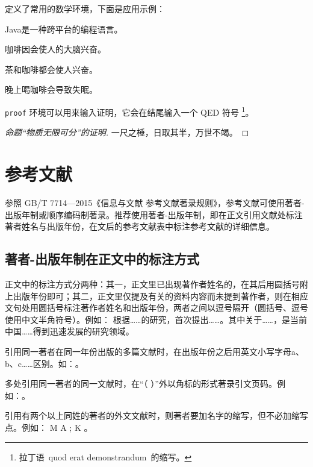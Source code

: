 \ucasthesis{} 定义了常用的数学环境，下面是应用示例：
\begin{definition}
Java是一种跨平台的编程语言。
\end{definition}

\begin{theorem}
咖啡因会使人的大脑兴奋。
\end{theorem}

\begin{lemma}
茶和咖啡都会使人兴奋。
\end{lemma}

\begin{corollary}
晚上喝咖啡会导致失眠。
\end{corollary}

\texttt{proof} 环境可以用来输入证明，它会在结尾输入一个 QED 符号
\footnote{拉丁语~quod erat demonstrandum~的缩写。}。

\begin{proof}[命题“物质无限可分”的证明]
一尺之棰，日取其半，万世不竭。
\end{proof}

\section{参考文献}
\label{sec:ref_examples}

参照 GB/T 7714—2015《信息与文献 参考文献著录规则》，参考文献可使用著者-出版年制或顺序编码制著录。推荐使用著者-出版年制，即在正文引用文献处标注著者姓名与出版年份，在文后的参考文献表中标注参考文献的详细信息。

\subsection{著者-出版年制在正文中的标注方式}

正文中的标注方式分两种：其一，正文里已出现著作者姓名的，在其后用圆括号附上出版年份即可；其二，正文里仅提及有关的资料内容而未提到著作者，则在相应文句处用圆括号标注著作者姓名和出版年份，两者之间以逗号隔开（圆括号、逗号使用中文半角符号）。例如：
\citet{nadkarni1992} 根据……的研究，首次提出……。其中关于……\citep{nadkarni1992}，是当前中国……得到迅速发展的研究领域\citep{zhu1973}。

引用同一著者在同一年份出版的多篇文献时，在出版年份之后用英文小写字母a、b、c……区别。如：\citet{chen2001a,chen2001b}。

多处引用同一著者的同一文献时，在“（ ）”外以角标的形式著录引文页码。例如：\citep[][343-351]{hua1973}。

引用有两个以上同姓的著者的外文文献时，则著者要加名字的缩写，但不必加缩写点。例如： M A \citet{nadkarni1992}; K \citet{nadkarni1992mechanism}。

